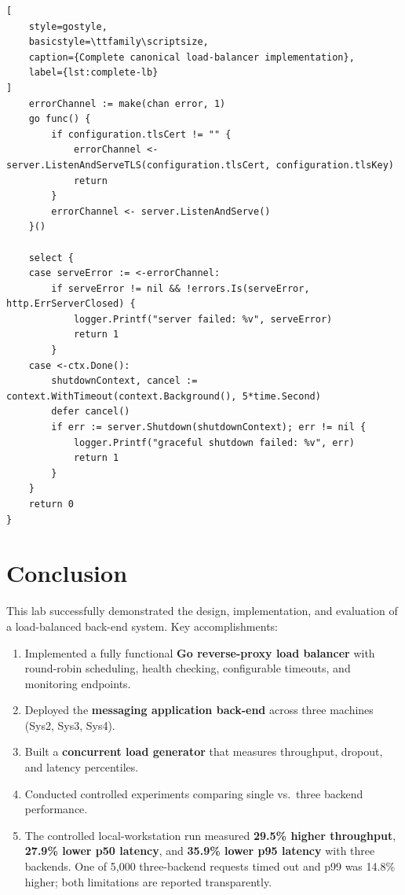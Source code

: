 \documentclass[12pt,a4paper]{article}
\begin{document}
\begin{lstlisting}[
    style=gostyle,
    basicstyle=\ttfamily\scriptsize,
    caption={Complete canonical load-balancer implementation},
    label={lst:complete-lb}
]
	errorChannel := make(chan error, 1)
	go func() {
		if configuration.tlsCert != "" {
			errorChannel <- server.ListenAndServeTLS(configuration.tlsCert, configuration.tlsKey)
			return
		}
		errorChannel <- server.ListenAndServe()
	}()

	select {
	case serveError := <-errorChannel:
		if serveError != nil && !errors.Is(serveError, http.ErrServerClosed) {
			logger.Printf("server failed: %v", serveError)
			return 1
		}
	case <-ctx.Done():
		shutdownContext, cancel := context.WithTimeout(context.Background(), 5*time.Second)
		defer cancel()
		if err := server.Shutdown(shutdownContext); err != nil {
			logger.Printf("graceful shutdown failed: %v", err)
			return 1
		}
	}
	return 0
}
\end{lstlisting}

\section{Conclusion}

This lab successfully demonstrated the design, implementation, and evaluation of a load-balanced back-end system. Key accomplishments:

\begin{enumerate}[leftmargin=2em]
    \item Implemented a fully functional \textbf{Go reverse-proxy load balancer} with round-robin scheduling, health checking, configurable timeouts, and monitoring endpoints.
    \item Deployed the \textbf{messaging application back-end} across three machines (Sys2, Sys3, Sys4).
    \item Built a \textbf{concurrent load generator} that measures throughput, dropout, and latency percentiles.
    \item Conducted controlled experiments comparing single vs.\ three backend performance.
    \item The controlled local-workstation run measured \textbf{29.5\% higher throughput}, \textbf{27.9\% lower p50 latency}, and \textbf{35.9\% lower p95 latency} with three backends. One of 5,000 three-backend requests timed out and p99 was 14.8\% higher; both limitations are reported transparently.
\end{enumerate}
\end{document}
